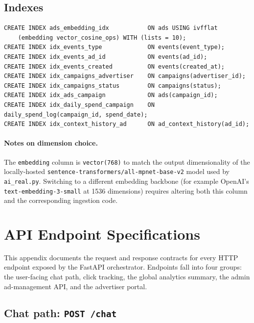 \begin{appendices}
\subsection*{Indexes}

\begin{lstlisting}[style=sqlstyle, caption={Index definitions. The
    IVFFlat vector index is created empty and becomes effective once
    ads are inserted.}]
CREATE INDEX ads_embedding_idx           ON ads USING ivfflat
    (embedding vector_cosine_ops) WITH (lists = 10);
CREATE INDEX idx_events_type             ON events(event_type);
CREATE INDEX idx_events_ad_id            ON events(ad_id);
CREATE INDEX idx_events_created          ON events(created_at);
CREATE INDEX idx_campaigns_advertiser    ON campaigns(advertiser_id);
CREATE INDEX idx_campaigns_status        ON campaigns(status);
CREATE INDEX idx_ads_campaign            ON ads(campaign_id);
CREATE INDEX idx_daily_spend_campaign    ON daily_spend_log(campaign_id, spend_date);
CREATE INDEX idx_context_history_ad      ON ad_context_history(ad_id);
\end{lstlisting}

\paragraph{Notes on dimension choice.} The \texttt{embedding} column is
\texttt{vector(768)} to match the output dimensionality of the
locally-hosted \texttt{sentence-transformers/all-mpnet-base-v2} model
used by \texttt{ai\_real.py}. Switching to a different embedding
backbone (for example OpenAI's \texttt{text-embedding-3-small} at 1536
dimensions) requires altering both this column and the corresponding
ingestion code.


\section{API Endpoint Specifications}
\label{app:api-endpoints}

This appendix documents the request and response contracts for every
HTTP endpoint exposed by the FastAPI orchestrator. Endpoints fall into
four groups: the user-facing chat path, click tracking, the global
analytics summary, the admin ad-management API, and the advertiser
portal.

\subsection*{Chat path: \texttt{POST /chat}}


\end{appendices}
